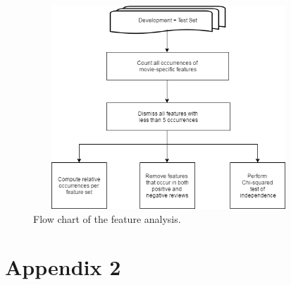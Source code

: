 \documentclass[
10pt, %
a4paper, %
oneside, %
headinclude,footinclude, %
] {book}%
\begin{document}
\begin{figure}[hbtp]\centering
\includegraphics[width=4in, height=3in]{analysis} 
\caption{Flow chart of the feature analysis.\label{Figure 4}}
\end{figure}

\chapter*{Appendix 2}
\end{document}
